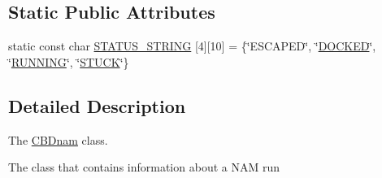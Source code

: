 \subsection*{Static Public Attributes}
\begin{DoxyCompactItemize}
\item 
static const char \hyperlink{classCBDnam_a0ca7d3cb1a694687bc249cb90bd549f0}{S\-T\-A\-T\-U\-S\-\_\-\-S\-T\-R\-I\-N\-G} \mbox{[}4\mbox{]}\mbox{[}10\mbox{]} = \{\char`\"{}E\-S\-C\-A\-P\-E\-D\char`\"{}, \char`\"{}\hyperlink{classCBDnam_a9b511229c3d251ea1d4bae1c67d0ea8fabea72b0c444a7d389435b3b22be00b90}{D\-O\-C\-K\-E\-D}\char`\"{}, \char`\"{}\hyperlink{classCBDnam_a9b511229c3d251ea1d4bae1c67d0ea8fab5cac5babdaabba5b3c28b55b54bcfbc}{R\-U\-N\-N\-I\-N\-G}\char`\"{}, \char`\"{}\hyperlink{classCBDnam_a9b511229c3d251ea1d4bae1c67d0ea8fa09fbb1316278782c3117ea3c6192e696}{S\-T\-U\-C\-K}\char`\"{}\}
\end{DoxyCompactItemize}


\subsection{Detailed Description}
The \hyperlink{classCBDnam}{C\-B\-Dnam} class. 

The class that contains information about a N\-A\-M run 

